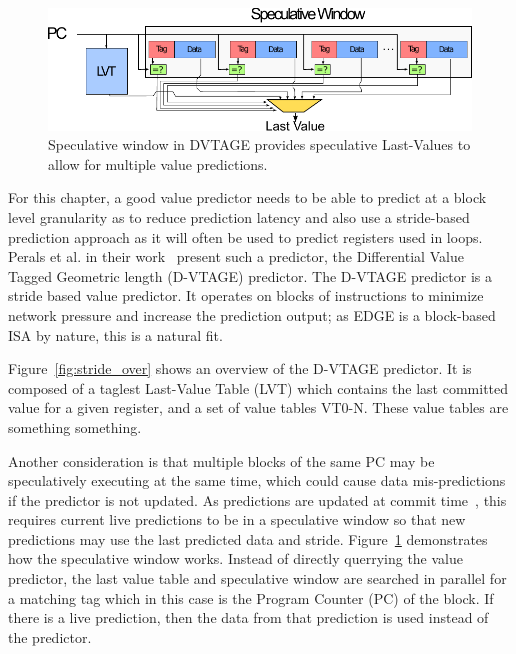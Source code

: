 \begin{figure}[t]
    \centering
    \includegraphics[width=1\textwidth]{chapter3/graphics/specwindow.pdf}
    \caption{Speculative window in DVTAGE provides speculative Last-Values to allow for multiple value predictions.}
    \label{fig:specwin}
	\vspace{1em}
\end{figure}

For this chapter, a good value predictor needs to be able to predict at a block level granularity as to reduce prediction latency and also use a stride-based prediction approach as it will often be used to predict registers used in loops.
Perals et al. in their work~\cite{peraisBeBop2015} present such a predictor, the Differential Value Tagged Geometric length (D-VTAGE) predictor.
The D-VTAGE predictor is a stride based value predictor.
It operates on blocks of instructions to minimize network pressure and increase the prediction output; as EDGE is a block-based ISA by nature, this is a natural fit.

Figure~\ref{fig:stride_over} shows an overview of the D-VTAGE predictor.
It is composed of a taglest Last-Value Table (LVT) which contains the last committed value for a given register, and a set of value tables VT0-N.
These value tables are something something.

Another consideration is that multiple blocks of the same PC may be speculatively executing at the same time, which could cause data mis-predictions if the predictor is not updated.
As predictions are updated at commit time~\cite{paraisBeBop2015}, this requires current live predictions to be in a speculative window so that new predictions may use the last predicted data and stride.
Figure~\ref{fig:specwin} demonstrates how the speculative window works. 
Instead of directly querrying the value predictor, the last value table and speculative window are searched in parallel for a matching tag which in this case is the Program Counter (PC) of the block.
If there is a live prediction, then the data from that prediction is used instead of the predictor.

